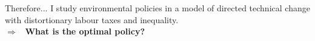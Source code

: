 \documentclass[11pt,aspectratio=169]{beamer}
\newcommand{\ar}{$\Rightarrow$ \ }
\begin{document}
%	
%		
%		

\begin{frame}
	\begin{block}{Therefore...}
I study environmental policies in a model of directed technical change with distortionary labour taxes and inequality. \\
\vspace{2mm}
\ar \textbf{What is the optimal policy?}
	\end{block}

\end{frame}
\end{document}
